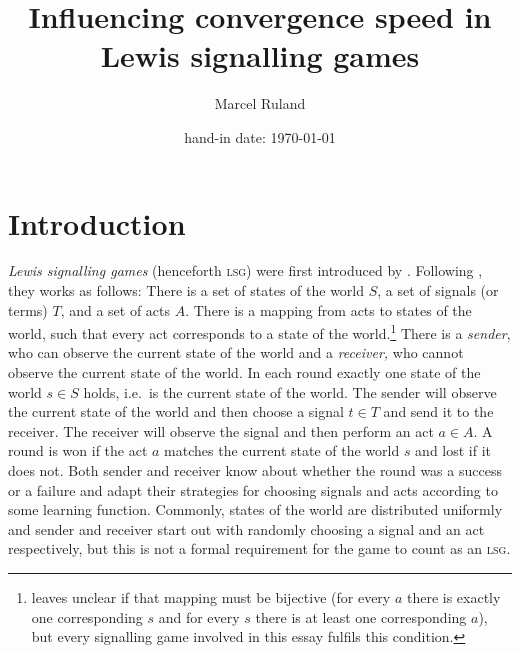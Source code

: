 \documentclass[DIV=calc,BCOR=0mm,pagesize]{scrartcl}
\title{Influencing convergence speed in Lewis signalling games}
\author{Marcel Ruland}
\date{hand-in date: \today}  %
\newcommand{\lsg}{\textsc{lsg}}
\begin{document}
\maketitle
\tableofcontents

\section{Introduction}
\label{sec:int}
\emph{Lewis signalling games} (henceforth \lsg) were first introduced by \citet{lewis_convention_1969}.
Following \citet[p.~530~ff.]{barrett_dynamic_2007}, they works as follows:
There is a set of states of the world \(S\), a set of signals (or terms) \(T\), and a set of acts \(A\).
There is a mapping from acts to states of the world, such that every act corresponds to a state of the world.\footnote{\citet{barrett_dynamic_2007} leaves unclear if that mapping must be bijective (for every \(a\) there is exactly one corresponding \(s\) and for every \(s\) there is at least one corresponding \(a\)), but every signalling game involved in this essay fulfils this condition.}
There is a \emph{sender}, who can observe the current state of the world and a \emph{receiver,} who cannot observe the current state of the world.
In each round exactly one state of the world \(s \in S\) holds, i.e.~is the current state of the world.
The sender will observe the current state of the world and then choose a signal \(t \in T\) and send it to the receiver.
The receiver will observe the signal and then perform an act \(a \in A\).
A round is won if the act \(a\) matches the current state of the world \(s\) and lost if it does not.
Both sender and receiver know about whether the round was a success or a failure and adapt their strategies for choosing signals and acts according to some learning function.
Commonly, states of the world are distributed uniformly and sender and receiver start out with randomly choosing a signal and an act respectively, but this is not a formal requirement for the game to count as an \lsg.
\end{document}
